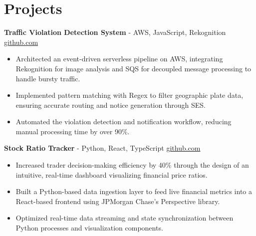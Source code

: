 \documentclass[11pt]{article}       %
\begin{document}

\vspace{-18.5pt}

\section*{Projects}

\textbf{Traffic Violation Detection System}{ - AWS, JavaScript, Rekognition} \hfill \href{https://github.com/Monica20030707/AWS_rekonigition-N-read-database}{github.com} \\
\vspace{-9pt}
\begin{itemize}
  \item Architected an event-driven serverless pipeline on AWS, integrating Rekognition for image analysis and SQS for decoupled message processing to handle bursty traffic.
  \item Implemented pattern matching with Regex to filter geographic plate data, ensuring accurate routing and notice generation through SES.
  \item Automated the violation detection and notification workflow, reducing manual processing time by over 90\%.
\end{itemize}

\textbf{Stock Ratio Tracker}{ - Python, React, TypeScript} \hfill \href{https://github.com/Monica20030707/Trading-Dashboard_UI}{github.com} \\
\vspace{-9pt}
\begin{itemize}
  \item Increased trader decision-making efficiency by 40\% through the design of an intuitive, real-time dashboard visualizing financial price ratios.
  \item Built a Python-based data ingestion layer to feed live financial metrics into a React-based frontend using JPMorgan Chase’s Perspective library.
  \item Optimized real-time data streaming and state synchronization between Python processes and visualization components.
\end{itemize}
\end{document}
